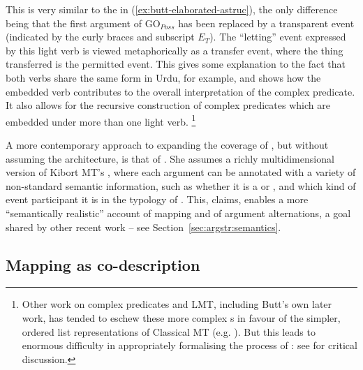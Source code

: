 \documentclass[output=paper]{langscibook}
\begin{document}
\eabox{
\label{ex:permissive-astruc}
\avm[id position=south-east, stretch = 1.2]{%
[
\normalfont\rmfamily de- `let'\\
\id{E}{[& $!\textnormal{CS}([\alpha], \textnormal{GO}_{\textit{Poss}}(\emptycurlybracks_{E_T}, \textnormal{TO}\emptybracks))!$\\
&$!\textnormal{AFF}(\emptybracks^{\alpha},\ )!$\\
&$!\textnormal{ASP}(\_\; \_\; \_)!$
 ]}
]
}
}
%
This is very similar to the \astruc{} in (\ref{ex:butt-elaborated-astruc}), the
only difference being that the first argument of GO$_\textit{Poss}$ has been
replaced by a transparent event (indicated by the curly braces and subscript
$E_T$). The ``letting'' event expressed by this light verb is viewed
metaphorically as a transfer event, where the thing transferred is the permitted
event. This gives some explanation to the fact that both verbs share the same
form in Urdu, for example, and shows how the embedded verb contributes to the
overall interpretation of the complex predicate. It also allows for the
recursive construction of complex predicates which are embedded under more than
one light verb.%
%
\footnote{Other work on complex predicates and LMT, including Butt's own later
  work, has tended to eschew these more complex \astruc{}s in favour of the
  simpler, ordered list representations of Classical MT (e.g.
  \citealt{alsina1996the-role,Alsina1997,Butt2014}). But this leads to enormous
  difficulty in appropriately formalising the process of :
  see \citet[sec.~2]{Lowe2015} for critical discussion.}
%

A more contemporary approach to expanding the coverage of \astruc, but without
assuming the \citet{AsudGior12} architecture, is that of
\citet[ch.~6]{schaetzle18}. She assumes a richly multidimensional version of
Kibort MT's \astruc, where each argument can be annotated with a variety of
non-standard semantic information, such as whether it is a  or
 \citep{talmy78}, and which kind of event participant it is in the
typology of  . This,
\citet[202]{schaetzle18} claims, enables a more ``semantically realistic''
account of mapping and of argument alternations, a goal shared by other recent
work -- see Section~\ref{sec:argstr:semantics}.

\subsection{Mapping as co-description}\label{sec:argstr:nature-of-mapping}
\end{document}
